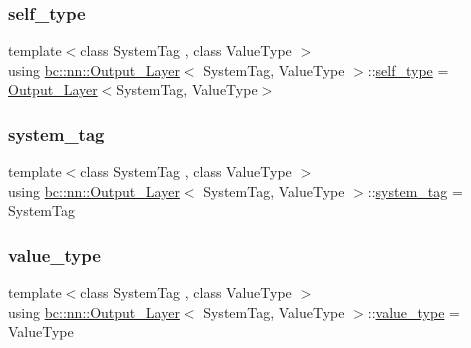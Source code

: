 \mbox{\label{structbc_1_1nn_1_1Output__Layer_ab795d02d54671c4235286a01e6bca7b9}} 
\subsubsection{\texorpdfstring{self\+\_\+type}{self\_type}}
{\footnotesize\ttfamily template$<$class System\+Tag , class Value\+Type $>$ \\
using \hyperlink{structbc_1_1nn_1_1Output__Layer}{bc\+::nn\+::\+Output\+\_\+\+Layer}$<$ System\+Tag, Value\+Type $>$\+::\hyperlink{structbc_1_1nn_1_1Output__Layer_ab795d02d54671c4235286a01e6bca7b9}{self\+\_\+type} =  \hyperlink{structbc_1_1nn_1_1Output__Layer}{Output\+\_\+\+Layer}$<$System\+Tag, Value\+Type$>$}

\mbox{\label{structbc_1_1nn_1_1Output__Layer_ab5c2079fa05605177c4d9e1553fe1f59}} 
\subsubsection{\texorpdfstring{system\+\_\+tag}{system\_tag}}
{\footnotesize\ttfamily template$<$class System\+Tag , class Value\+Type $>$ \\
using \hyperlink{structbc_1_1nn_1_1Output__Layer}{bc\+::nn\+::\+Output\+\_\+\+Layer}$<$ System\+Tag, Value\+Type $>$\+::\hyperlink{structbc_1_1nn_1_1Output__Layer_ab5c2079fa05605177c4d9e1553fe1f59}{system\+\_\+tag} =  System\+Tag}

\mbox{\label{structbc_1_1nn_1_1Output__Layer_a042986d141dc7ddda55273c8b50320c4}} 
\subsubsection{\texorpdfstring{value\+\_\+type}{value\_type}}
{\footnotesize\ttfamily template$<$class System\+Tag , class Value\+Type $>$ \\
using \hyperlink{structbc_1_1nn_1_1Output__Layer}{bc\+::nn\+::\+Output\+\_\+\+Layer}$<$ System\+Tag, Value\+Type $>$\+::\hyperlink{structbc_1_1nn_1_1Output__Layer_a042986d141dc7ddda55273c8b50320c4}{value\+\_\+type} =  Value\+Type}



